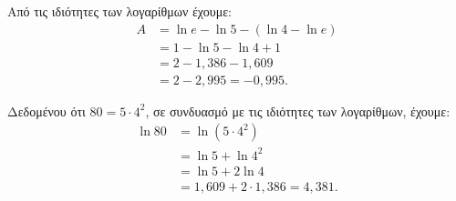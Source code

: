 \begin{alist}
\item Από τις ιδιότητες των λογαρίθμων έχουμε:
\begin{align*}
A &= \ln e - \ln 5 - (\ln 4 - \ln e) \\
&= 1 - \ln 5 - \ln 4 + 1 \\
&= 2 - 1{,}386 - 1{,}609 \\
&= 2 - 2{,}995 = -0{,}995.
\end{align*}
\item Δεδομένου ότι $80 = 5 \cdot 4^2$, σε συνδυασμό με τις ιδιότητες των λογαρίθμων, έχουμε:
\begin{align*}
\ln 80 &= \ln(5 \cdot 4^2) \\
&= \ln 5 + \ln 4^2 \\
&= \ln 5 + 2\ln 4 \\
&= 1{,}609 + 2 \cdot 1{,}386 = 4{,}381.
\end{align*}
\end{alist}

